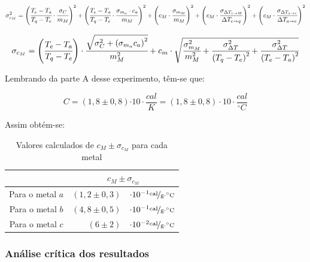 \documentclass[a4paper]{article}
\providecommand{\tabularnewline}{\\}
\begin{document}
				\[
					\sigma_{c_{M}}^{2}=
						\left(\cfrac{T_{e}-T_{a}}{T_{q}-T_{e}}\cdot\cfrac{\sigma_{C}}{m_{M}}\right)^{2}+
						\left(\cfrac{T_{e}-T_{a}}{T_{q}-T_{e}}\cdot\cfrac{\sigma_{m_{a}}\cdot c_{a}}{m_{M}}\right)^{2}+
						\left(c_{M}\cdot\cfrac{\sigma_{m_{M}}}{m_{M}}\right)^{2}+
						\left(c_{M}\cdot\cfrac{\sigma_{\Delta T_{e\rightarrow M}}}{\Delta T_{e\rightarrow q}}\right)^{2}+
						\left(c_{M}\cdot\cfrac{\sigma_{\Delta T_{a\rightarrow e}}}{\Delta T_{a\rightarrow e}}\right)^{2}
				\]


				\begin{equation}
					\sigma_{c_{M}}=
						\left(\cfrac{T_{e}-T_{a}}{T_{q}-T_{e}}\right)\cdot\cfrac{\sqrt{\sigma_{C}^{2}+
						\left(\sigma_{m_{a}}c_{a}\right)^{2}}}{m_{M}^{2}}+c_{m}\cdot\sqrt{\cfrac{\sigma_{m_{M}}^{2}}{m_{M}^{2}}+\cfrac{\sigma_{\Delta T}^{2}}{
						\left(T_{q}-T_{e}\right)^{2}}+\cfrac{\sigma_{\Delta T}^{2}}{
						\left(T_{e}-T_{a}\right)^{2}}}
				\end{equation}


				Lembrando da parte A desse experimento, têm-se que:

				\begin{equation}
					C=\left(1,8\pm0,8\right)\unit{\cdot10\cdot\frac{cal}{K}=\left(1,8\pm0,8\right)\cdot10\cdot}\frac{cal}{^{\circ}C}
				\end{equation}


				Assim obtém-se:

				\begin{table}[!ht]
					\caption{Valores calculados de $c_{M}\pm\sigma_{c_{M}}$ para cada metal}


					\centering{}%
					\begin{tabular}{|c|rl|}
						\cline{2-3} 
						\multicolumn{1}{c|}{} & \multicolumn{2}{c|}{$c_{M}\pm\sigma_{c_{M}}$}\tabularnewline
						\hline 
						Para o metal $a$  & $\left(1,2\pm0,3\right)$  & $\cdot10^{-1}\unitfrac{cal}{g\cdot^{\circ}C}$\tabularnewline
						\hline 
						Para o metal $b$  & $\left(4,8\pm0,5\right)$  & $\cdot10^{-1}\unitfrac{cal}{g\cdot^{\circ}C}$\tabularnewline
						\hline 
						Para o metal $c$  & $\left(6\pm2\right)$  & $\cdot10^{-2}\unitfrac{cal}{g\cdot^{\circ}C}$\tabularnewline
						\hline 
					\end{tabular}
				\end{table}

			\subsubsection{Análise crítica dos resultados}
\end{document}
